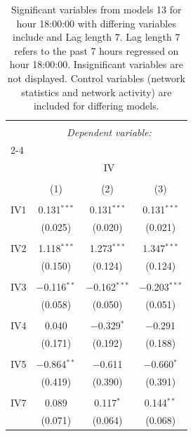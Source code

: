 
\begin{table}[!htbp] \centering 
  \caption{Significant variables from models 13 for hour 18:00:00 with differing variables include 
                               and Lag length 7. Lag length 7 refers to the past 7 hours regressed on hour 18:00:00. 
                               Insignificant variables are not displayed. 
                               Control variables (network statistics and network activity) are 
                               included for differing models.} 
  \label{IVmodels2_t_hourlagged5} 
\scriptsize 
\begin{tabular}{@{\extracolsep{5pt}}lccc} 
\\[-1.8ex]\hline 
\hline \\[-1.8ex] 
 & \multicolumn{3}{c}{\textit{Dependent variable:}} \\ 
\cline{2-4} 
\\[-1.8ex] & \multicolumn{3}{c}{IV} \\ 
\\[-1.8ex] & (1) & (2) & (3)\\ 
\hline \\[-1.8ex] 
 IV1 & 0.131$^{***}$ & 0.131$^{***}$ & 0.131$^{***}$ \\ 
  & (0.025) & (0.020) & (0.021) \\ 
  & & & \\ 
 IV2 & 1.118$^{***}$ & 1.273$^{***}$ & 1.347$^{***}$ \\ 
  & (0.150) & (0.124) & (0.124) \\ 
  & & & \\ 
 IV3 & $-$0.116$^{**}$ & $-$0.162$^{***}$ & $-$0.203$^{***}$ \\ 
  & (0.058) & (0.050) & (0.051) \\ 
  & & & \\ 
 IV4 & 0.040 & $-$0.329$^{*}$ & $-$0.291 \\ 
  & (0.171) & (0.192) & (0.188) \\ 
  & & & \\ 
 IV5 & $-$0.864$^{**}$ & $-$0.611 & $-$0.660$^{*}$ \\ 
  & (0.419) & (0.390) & (0.391) \\ 
  & & & \\ 
 IV7 & 0.089 & 0.117$^{*}$ & 0.144$^{**}$ \\ 
  & (0.071) & (0.064) & (0.068) \\ 

\end{tabular}
\end{table}
